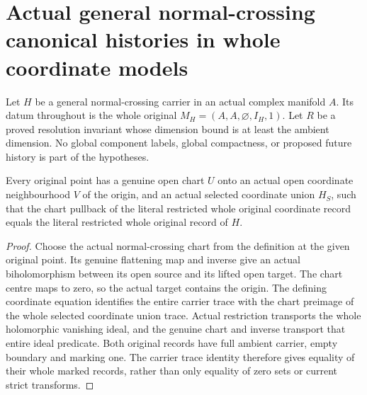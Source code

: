 \section{Actual general normal-crossing canonical histories in whole coordinate models}
\label{sec:hironaka-normal-crossings-canonical-chart-histories}

Let $H$ be a general normal-crossing carrier in an actual complex
manifold $A$. Its datum throughout is the whole original
$M_H=(A,A,\varnothing,I_H,1)$. Let $R$ be a proved resolution invariant
whose dimension bound is at least the ambient dimension. No global
component labels, global compactness, or proposed future history is
part of the hypotheses.

\begin{theorem}
\label{hir:general-nc-actual-original-coordinate-chart-record}
Every original point has a genuine open chart $U$ onto an actual open
coordinate neighbourhood $V$ of the origin, and an actual selected
coordinate union $H_S$, such that the chart pullback of the literal
restricted whole original coordinate record equals the literal
restricted whole original record of $H$.
\leanok
{}
\end{theorem}
\begin{proof}
Choose the actual normal-crossing chart from the definition at the
given original point. Its genuine flattening map and inverse give an
actual biholomorphism between its open source and its lifted open
target. The chart centre maps to zero, so the actual target contains
the origin. The defining coordinate equation identifies the entire
carrier trace with the chart preimage of the whole selected coordinate
union trace. Actual restriction transports the whole holomorphic
vanishing ideal, and the genuine chart and inverse transport that
entire ideal predicate. Both original records have full ambient
carrier, empty boundary and marking one. The carrier trace identity
therefore gives equality of their whole marked records, rather than
only equality of zero sets or current strict transforms.
\end{proof}


